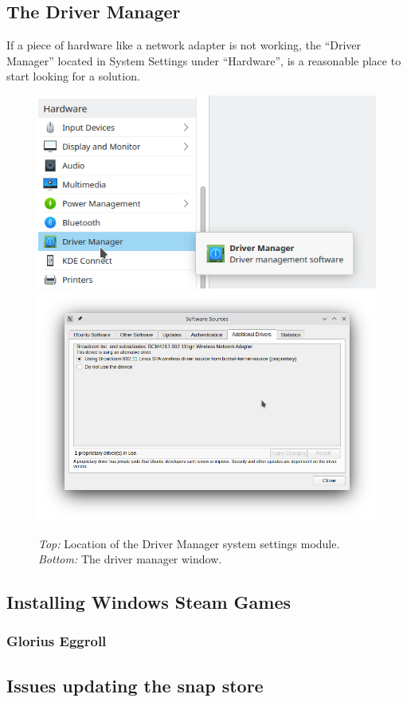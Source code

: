 \documentclass[a4paper, 12pt]{article}
\begin{document}
\subsection{The Driver Manager}

If a piece of hardware like a network adapter is not working, the ``Driver Manager'' located in System
Settings under ``Hardware'', is a reasonable place to start looking for a solution.

\begin{figure}[h]
 \centering
 \includegraphics[width=0.6\linewidth]{images/driver_manager_location}
 \includegraphics[width=0.6\linewidth]{images/driver_manager_window}
 \caption{\textit{Top:} Location of the Driver Manager system settings module. \textit{Bottom:} The driver
 manager window.}\label{fig:drivers}
\end{figure}

\subsection{Installing Windows Steam Games}

\subsubsection{Glorius Eggroll}

\subsection{Issues updating the snap store}
\end{document}
